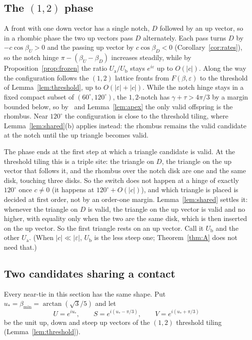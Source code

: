 \documentclass[11pt]{amsart}
\theoremstyle{definition}
\newcommand{\eps}{\varepsilon}
\newcommand{\Ua}{U_{\mathrm a}}
\newcommand{\Ub}{U_{\mathrm b}}
\begin{document}
\subsection{The \texorpdfstring{$(1,2)$}{(1,2)} phase} A front with one down vector has a single notch, $D$ followed by an
up vector, so in a rhombic phase the two up vectors pass $D$ alternately. Each pass turns $D$ by
$-c\cos\beta_U>0$ and the passing up vector by $c\cos\beta_D<0$ (Corollary~\ref{cor:rates}), so
the notch hinge $\pi-(\beta_U-\beta_D)$ increases steadily, while by
Proposition~\ref{prop:frozen} the ratio $\Ua/\Ub$ stays $e^{i\eps}$ up to $O(|c|)$. Along the
way the configuration follows the $(1,2)$ lattice fronts from $F(\beta,\eps)$ to the threshold of
Lemma~\ref{lem:threshold}, up to $O(|\eps|+|c|)$. While the notch hinge stays in a fixed compact subset of
$(60^\circ,120^\circ)$, the $1,2$-notch has $\gamma+\tau>4\pi/3$ by a margin bounded below, so
by~\cite[Prop.~4.3]{GD} and Lemma~\ref{lem:apex} the only valid offspring is the rhombus. Near $120^\circ$ the
configuration is close to the threshold tiling, where Lemma~\ref{lem:shared}(b) applies instead: the
rhombus remains the valid candidate at the notch until the up triangle becomes valid.

The phase ends at the first step at which a triangle candidate is valid. At the threshold tiling this is
a triple site: the triangle on $D$, the triangle on the up vector that follows it, and the rhombus over the
notch disk are one and the same disk, touching three disks. So the switch does not happen at a hinge of
exactly $120^\circ$ once $c\ne0$ (it happens at $120^\circ+O(|c|)$), and which triangle is placed is decided
at first order, not by an order-one margin. Lemma~\ref{lem:shared} settles it: whenever the triangle on
$D$ is valid, the triangle on the up vector is valid and no higher, with equality only when the two are
the same disk, which is then inserted on the up vector. So the first triangle rests on an up vector. Call
it $\Ub$ and the other $\Ua$. (When $|c|\ll|\eps|$, $\Ub$ is the less steep one; Theorem~\ref{thm:A} does not
need that.)

\subsection{Two candidates sharing a contact}
Every near-tie in this section has the same shape. Put
$u_*=\beta_{\min}=\arctan(\sqrt3/5)$ and let
\[
U=e^{iu_*},\qquad S=e^{i(u_*-\pi/3)},\qquad V=e^{i(u_*+\pi/3)}
\]
be the unit up, down and steep up vectors of the $(1,2)$ threshold tiling (Lemma~\ref{lem:threshold}).
\end{document}
